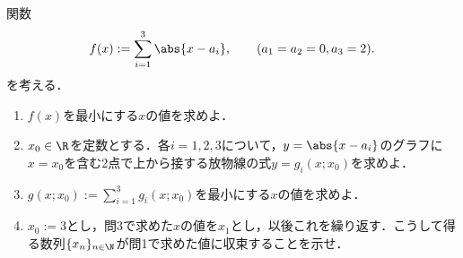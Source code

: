 \documentclass[uplatex,dvipdfmx]{jsarticle}
\begin{document}
\begin{tcolorbox}[colframe=ForestGreen, colback=ForestGreen!10!white,breakable,colbacktitle=ForestGreen!40!white,coltitle=black,fonttitle=\bfseries\sffamily,
    title=第３問]
    \begin{problem}\label{prob-18-1-3}
        関数
        \[f(x):=\sum_{i=1}^3\abs{x-a_i},\qquad(a_1=a_2=0,a_3=2).\]
        を考える．
        \begin{enumerate}[{問}1]
            \item $f(x)$を最小にする$x$の値を求めよ．
            \item $x_0\in\R$を定数とする．各$i=1,2,3$について，$y=\abs{x-a_i}$のグラフに$x=x_0$を含む2点で上から接する放物線の式$y=g_i(x;x_0)$を求めよ．
            \item $g(x;x_0):=\sum_{i=1}^3g_i(x;x_0)$を最小にする$x$の値を求めよ．
            \item $x_0:=3$とし，問3で求めた$x$の値を$x_1$とし，以後これを繰り返す．こうして得る数列$\{x_n\}_{n\in\N}$が問1で求めた値に収束することを示せ．
        \end{enumerate}
    \end{problem}
\end{tcolorbox}
\end{document}

